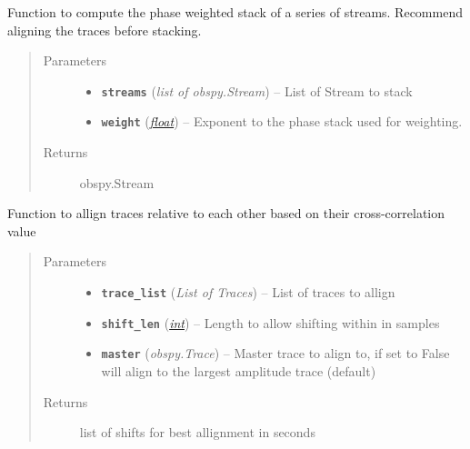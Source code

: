 \documentclass[a4paper,10pt,english]{sphinxmanual}
\begin{document}
\begin{fulllineitems}
\label{submodules/utils.stacking:stacking.PWS_stack}
Function to compute the phase weighted stack of a series of streams.
Recommend aligning the traces before stacking.
\begin{quote}\begin{description}
\item[{Parameters}] \leavevmode\begin{itemize}
\item {} 
\textbf{\texttt{streams}} (\emph{list of obspy.Stream}) -- List of Stream to stack

\item {} 
\textbf{\texttt{weight}} (\href{https://docs.python.org/library/functions.html\#float}{\emph{float}}) -- Exponent to the phase stack used for weighting.

\end{itemize}

\item[{Returns}] \leavevmode
obspy.Stream

\end{description}\end{quote}

\end{fulllineitems}


\begin{fulllineitems}
\label{submodules/utils.stacking:stacking.align_traces}
Function to allign traces relative to each other based on their
cross-correlation value
\begin{quote}\begin{description}
\item[{Parameters}] \leavevmode\begin{itemize}
\item {} 
\textbf{\texttt{trace\_list}} (\emph{List of Traces}) -- List of traces to allign

\item {} 
\textbf{\texttt{shift\_len}} (\href{https://docs.python.org/library/functions.html\#int}{\emph{int}}) -- Length to allow shifting within in samples

\item {} 
\textbf{\texttt{master}} (\emph{obspy.Trace}) -- Master trace to align to, if set to False will align to the        largest amplitude trace (default)

\end{itemize}

\item[{Returns}] \leavevmode
list of shifts for best allignment in seconds

\end{description}\end{quote}

\end{fulllineitems}
\end{document}
